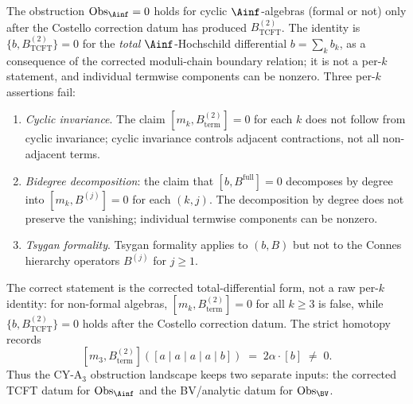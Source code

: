 \begin{remark}
\label{rem:cyclic-ainf-framing-audit}
The obstruction $\mathrm{Obs}_{\Ainf} = 0$ holds for cyclic
$\Ainf$-algebras (formal or not) only after the Costello correction datum
has produced $B^{(2)}_{\mathrm{TCFT}}$.
The identity is
$\{b, B^{(2)}_{\mathrm{TCFT}}\} = 0$ for the \emph{total}
$\Ainf$-Hochschild differential $b = \sum_k b_k$, as a consequence of
the corrected moduli-chain boundary relation; it is not a per-$k$
statement, and individual termwise components can be nonzero. Three
per-$k$ assertions fail:
\begin{enumerate}[label=\textup{(\alph*)}]
 \item \emph{Cyclic invariance}. The claim $[m_k, B^{(2)}_{\mathrm{term}}]=0$
 for each $k$ does not follow from cyclic invariance; cyclic invariance
 controls adjacent contractions, not all non-adjacent terms.
 \item \emph{Bidegree decomposition}: the claim that $[b, B^{\mathrm{full}}] = 0$
 decomposes by degree into $[m_k, B^{(j)}] = 0$ for each $(k,j)$.
 The decomposition by degree does not preserve the vanishing; individual
 termwise components can be nonzero.
 \item \emph{Tsygan formality}.
 Tsygan formality applies to $(b, B)$ but not to the Connes hierarchy
 operators $B^{(j)}$ for $j \geq 1$.
\end{enumerate}
The correct statement is the corrected total-differential form, not a
raw per-$k$ identity: for non-formal algebras,
$[m_k, B^{(2)}_{\mathrm{term}}]=0$ for all $k \geq 3$ is false, while
$\{b, B^{(2)}_{\mathrm{TCFT}}\}=0$ holds after the Costello correction
datum. The strict homotopy records
\[
 [m_3, B^{(2)}_{\mathrm{term}}]([a \mid a \mid a \mid a \mid b])
 \;=\; 2\alpha \cdot [b] \;\neq\; 0 .
\]
Thus the CY-A$_3$ obstruction landscape keeps two separate inputs:
the corrected TCFT datum for $\mathrm{Obs}_{\Ainf}$ and the
BV/analytic datum for $\mathrm{Obs}_{\BV}$.
\end{remark}

